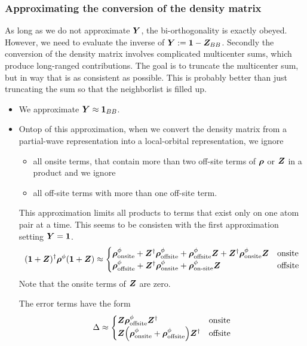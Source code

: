 \documentclass[11pt,a4paper]{report}
\begin{document}
\subsubsection{Approximating the conversion of the density matrix}
As long as we do not approximate $\bm{Y}$, the bi-orthogonality is
exactly obeyed. However, we need to evaluate the inverse of
$\bm{Y}:=\bm{1}-\bm{Z}_{BB}$. Secondly the conversion of the
density matrix involves complicated multicenter sums, which produce
long-ranged contributions. The goal is to truncate the multicenter
sum, but in way that is as consistent as possible. This is probably
better than just truncating the sum so that the neighborlist is filled
up.
\begin{itemize}
\item We approximate $\bm{Y}\approx\bm{1}_{BB}$.
%
\item Ontop of this approximation, when we convert the density matrix
  from a partial-wave representation into a local-orbital
  representation, we ignore
\begin{itemize}
\item all onsite terms, that contain more than two off-site terms of
  $\bm{\rho}$ or $\bm{Z}$ in a product and we ignore
%
\item all off-site terms with more than one off-site term.
\end{itemize}
This approximation limits all products to terms that exist only on one
atom pair at a time. This seems to be consisten with the first
approximation setting $\bm{Y}=\bm{1}$.
\begin{eqnarray}
(\bm{1}+\bm{Z})^\dagger\bm{\rho}^\phi(\bm{1}+\bm{Z})
\approx
\begin{cases}
\bm{\rho}^\phi_{\text{onsite}}+\bm{Z}^\dagger\bm{\rho}^\phi_{\text{offsite}}
+\bm{\rho}^\phi_{\text{offsite}}\bm{Z}
+\bm{Z}^\dagger \bm{\rho}^\phi_{\text{onsite}}\bm{Z}
&\text{onsite}
\\
\bm{\rho}^\phi_{\text{offsite}}+\bm{Z}^\dagger\bm{\rho}^\phi_{\text{onsite}}
+\bm{\rho}^\phi_{\text{on-site}}\bm{Z}
&\text{offsite}\\
\end{cases}
\end{eqnarray}
Note that the onsite terms of $\bm{Z}$ are zero. 


The error terms have the form
\begin{eqnarray}
\Delta
\approx
\begin{cases}
\bm{Z} \bm{\rho}^\phi_{\text{offsite}}\bm{Z}^\dagger 
&\text{onsite}
\\
\bm{Z} \Bigl(\bm{\rho}^\phi_{\text{onsite}}
+\bm{\rho}^\phi_{\text{offsite}}\Bigr)\bm{Z}^\dagger 
&\text{offsite}\\
\end{cases}
\end{eqnarray}
\end{itemize}
\end{document}
